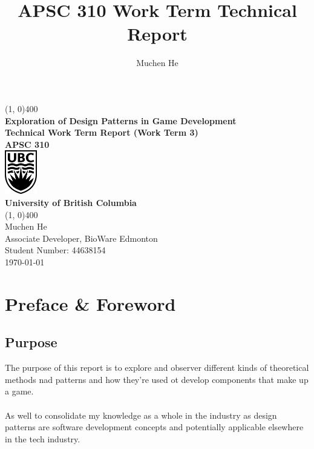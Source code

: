\documentclass[10pt,letterpaper]{article}
\author{Muchen He}
\title{APSC 310 Work Term Technical Report}
\newcommand{\titletext}{Exploration of Design Patterns in Game Development}
\begin{document}
\begin{titlepage}
	\begin{center}
		\vspace*{2in}
		\line(1, 0){400}\\
		\Huge{\textbf{\titletext{}}}\\[0.2cm]
		\large{\textbf{Technical Work Term Report (Work Term 3)}}\\[1cm]
		\Large{\textbf{APSC 310}}\\[1cm]
		\includegraphics[width=1.4cm]{assets/ubc}\\
		\textbf{University of British Columbia}\\
		\line(1, 0){400}\\
		\vfill
		\Large{Muchen He}\\
		\large{Associate Developer, BioWare Edmonton}\\
		Student Number: 44638154\\

		\today \\
	\end{center}
\end{titlepage}

\setcounter{secnumdepth}{3}
\tableofcontents
\thispagestyle{empty}
\clearpage



\section*{Preface \& Foreword}

\subsection*{Purpose}

The purpose of this report is to explore and observer different kinds of theoretical methods nad patterns and how they're used ot develop components that make up a game.\\
\\
As well to consolidate my knowledge as a whole in the industry as design patterns are software development concepts and potentially applicable elsewhere in the tech industry.
\end{document}
